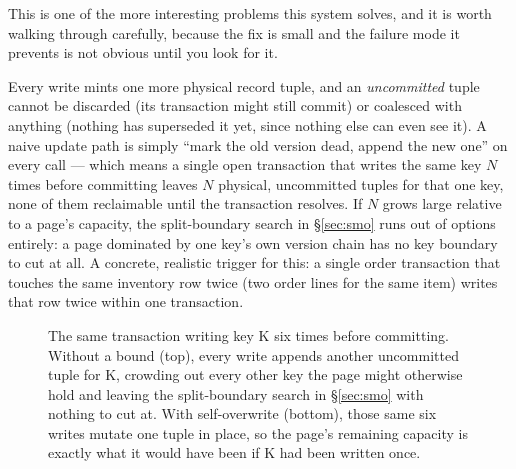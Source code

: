 \documentclass[11pt]{article}
\begin{document}
This is one of the more interesting problems this system solves, and it is worth
walking through carefully, because the fix is small and the failure mode it
prevents is not obvious until you look for it.

Every write mints one more physical record tuple, and an \emph{uncommitted} tuple
cannot be discarded (its transaction might still commit) or coalesced with anything
(nothing has superseded it yet, since nothing else can even see it). A naive update
path is simply ``mark the old version dead, append the new one'' on every call ---
which means a single open transaction that writes the same key $N$ times before
committing leaves $N$ physical, uncommitted tuples for that one key, none of them
reclaimable until the transaction resolves. If $N$ grows large relative to a page's
capacity, the split-boundary search in \S\ref{sec:smo} runs out of options entirely:
a page dominated by one key's own version chain has no key boundary to cut at all. A
concrete, realistic trigger for this: a single order transaction that touches the
same inventory row twice (two order lines for the same item) writes that row twice
within one transaction.

\begin{figure}[h]
\centering
{}
\caption{The same transaction writing key K six times before committing. Without a
  bound (top), every write appends another uncommitted tuple for K, crowding out
  every other key the page might otherwise hold and leaving the split-boundary
  search in \S\ref{sec:smo} with nothing to cut at. With self-overwrite (bottom),
  those same six writes mutate one tuple in place, so the page's remaining capacity
  is exactly what it would have been if K had been written once.}
\label{fig:selfoverwrite}
\end{figure}
\end{document}
